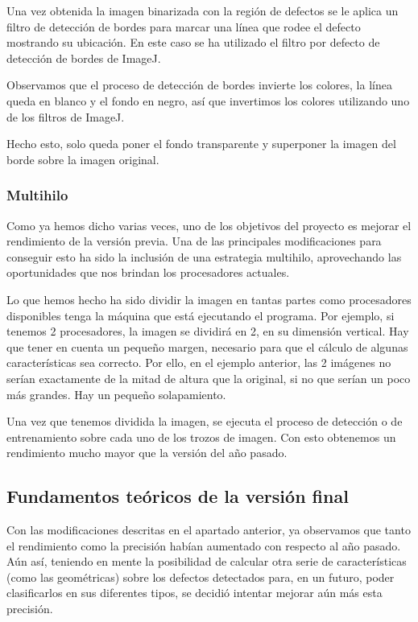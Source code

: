 Una vez obtenida la imagen binarizada con la región de defectos se le aplica un filtro de detección de bordes para marcar una línea que rodee el defecto mostrando su ubicación. En este caso se ha utilizado el filtro por defecto de detección de bordes de ImageJ.

Observamos que el proceso de detección de bordes invierte los colores, la línea queda en blanco y el fondo en negro, así que invertimos los colores utilizando uno de los filtros de ImageJ.

Hecho esto, solo queda poner el fondo transparente y superponer la imagen del borde sobre la imagen original.

\subsubsection{Multihilo}
Como ya hemos dicho varias veces, uno de los objetivos del proyecto es mejorar el rendimiento de la versión previa. Una de las principales modificaciones para conseguir esto ha sido la inclusión de una estrategia multihilo, aprovechando las oportunidades que nos brindan los procesadores actuales.

Lo que hemos hecho ha sido dividir la imagen en tantas partes como procesadores disponibles tenga la máquina que está ejecutando el programa. Por ejemplo, si tenemos 2 procesadores, la imagen se dividirá en 2, en su dimensión vertical. Hay que tener en cuenta un pequeño margen, necesario para que el cálculo de algunas características sea correcto. Por ello, en el ejemplo anterior, las 2 imágenes no serían exactamente de la mitad de altura que la original, si no que serían un poco más grandes. Hay un pequeño solapamiento.

Una vez que tenemos dividida la imagen, se ejecuta el proceso de detección o de entrenamiento sobre cada uno de los trozos de imagen. Con esto obtenemos un rendimiento mucho mayor que la versión del año pasado.


\subsection{Fundamentos teóricos de la versión final}
Con las modificaciones descritas en el apartado anterior, ya observamos que tanto el rendimiento como la precisión habían aumentado con respecto al año pasado. Aún así, teniendo en mente la posibilidad de calcular otra serie de características (como las geométricas) sobre los defectos detectados para, en un futuro, poder clasificarlos en sus diferentes tipos, se decidió intentar mejorar aún más esta precisión.

